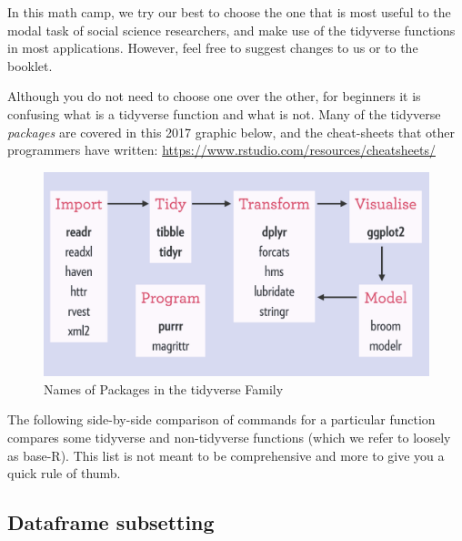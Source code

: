 \documentclass[
]{book}
\theoremstyle{definition}
\theoremstyle{definition}
\theoremstyle{definition}
\theoremstyle{definition}
\theoremstyle{remark}
\begin{document}
In this math camp, we try our best to choose the one that is most useful to the modal task of social science researchers, and make use of the tidyverse functions in most applications. However, feel free to suggest changes to us or to the booklet.

Although you do not need to choose one over the other, for beginners it is confusing what is a tidyverse function and what is not. Many of the tidyverse \emph{packages} are covered in this 2017 graphic below, and the cheat-sheets that other programmers have written: \url{https://www.rstudio.com/resources/cheatsheets/}

\begin{figure}
\centering
\includegraphics{images/tidyverse-packages.png}
\caption{Names of Packages in the tidyverse Family}
\end{figure}

The following side-by-side comparison of commands for a particular function compares some tidyverse and non-tidyverse functions (which we refer to loosely as base-R). This list is not meant to be comprehensive and more to give you a quick rule of thumb.

\hypertarget{dataframe-subsetting}{%
\subsection*{Dataframe subsetting}\label{dataframe-subsetting}}
\end{document}
